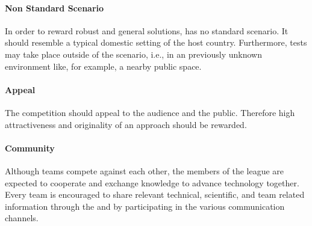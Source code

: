 \paragraph{Non Standard Scenario}
\label{sec:concepts:nonstandardscenario}
In order to reward robust and general solutions, \RoboCup\AtHome{} has no standard scenario. It should resemble a typical domestic setting of the host country. Furthermore, tests may take place outside of the scenario, i.e., in an previously unknown environment like, for example, a nearby public space.

\paragraph{Appeal}
\label{sec:concepts:appeal}
The competition should appeal to the audience and the public. Therefore high attractiveness and originality of an approach should be rewarded.

\paragraph{Community}
\label{sec:concepts:community}
Although teams compete against each other, the members of the \AtHome{} league are expected to cooperate and exchange knowledge to advance technology together. Every team is encouraged to share relevant technical, scientific, and team related information through the \TDP{} and by participating in the various communication channels.


